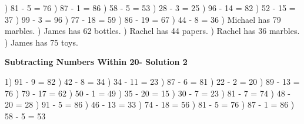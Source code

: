 \documentclass{article}%
\begin{document}
) 81 {-} 5 = 76%
) 87 {-} 1 = 86%
) 58 {-} 5 = 53%
) 28 {-} 3 = 25%
) 96 {-} 14 = 82%
) 52 {-} 15 = 37%
) 99 {-} 3 = 96%
) 77 {-} 18 = 59%
) 86 {-} 19 = 67%
) 44 {-} 8 = 36%
) Michael has 79 marbles.%
) James has 62 bottles.%
) Rachel has 44 papers.%
) Rachel has 36 marbles.%
) James has 75 toys.%
\newline%
\newpage%
\large%
\begin{center}%
\textbf{Subtracting Numbers Within 20- Solution 2}%
\newline%
\end{center} \normalsize%
1) 91 {-} 9 = 82%
) 42 {-} 8 = 34%
) 34 {-} 11 = 23%
) 87 {-} 6 = 81%
) 22 {-} 2 = 20%
) 89 {-} 13 = 76%
) 79 {-} 17 = 62%
) 50 {-} 1 = 49%
) 35 {-} 20 = 15%
) 30 {-} 7 = 23%
) 81 {-} 7 = 74%
) 48 {-} 20 = 28%
) 91 {-} 5 = 86%
) 46 {-} 13 = 33%
) 74 {-} 18 = 56%
) 81 {-} 5 = 76%
) 87 {-} 1 = 86%
) 58 {-} 5 = 53%
\newline%
\end{document}
